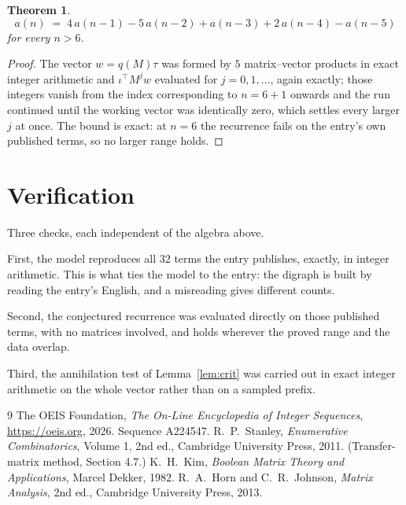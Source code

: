 \documentclass[11pt,a4paper]{article}
\theoremstyle{plain}
\newtheorem{theorem}{Theorem}
\theoremstyle{definition}
\begin{document}
\begin{theorem}
\[
a(n)\;=\;4\,a(n-1) - 5\,a(n-2) + a(n-3) + 2\,a(n-4) - a(n-5)
\]
for every $n>6$.
\end{theorem}

\begin{proof}
The vector $w=q(M)\tau$ was formed by $5$ matrix--vector products in exact integer
arithmetic and $\iota^{\!\top}M^{j}w$ evaluated for $j=0,1,\dots$, again exactly; those
integers vanish from the index corresponding to $n=6+1$ onwards and the run continued
until the working vector was identically zero, which settles every larger $j$ at once. The bound is exact: at $n=6$ the recurrence fails on the entry's own published terms, so no larger range holds.
\end{proof}

\section{Verification}

Three checks, each independent of the algebra above.

First, the model reproduces all $32$ terms the entry publishes, exactly, in integer
arithmetic. This is what ties the model to the entry: the digraph is built by reading the
entry's English, and a misreading gives different counts.

Second, the conjectured recurrence was evaluated directly on those published terms, with no
matrices involved, and holds wherever the proved range and the data overlap.

Third, the annihilation test of Lemma~\ref{lem:crit} was carried out in exact integer
arithmetic on the whole vector rather than on a sampled prefix.

\begin{thebibliography}{9}
 The OEIS Foundation, \emph{The On-Line Encyclopedia of Integer
Sequences}, \url{https://oeis.org}, 2026. Sequence A224547.
 R.~P.~Stanley, \emph{Enumerative Combinatorics}, Volume 1, 2nd ed.,
Cambridge University Press, 2011. (Transfer-matrix method, Section 4.7.)
 K.~H.~Kim, \emph{Boolean Matrix Theory and Applications}, Marcel Dekker,
1982.
 R.~A.~Horn and C.~R.~Johnson, \emph{Matrix Analysis}, 2nd ed., Cambridge
University Press, 2013.
\end{thebibliography}
\end{document}
